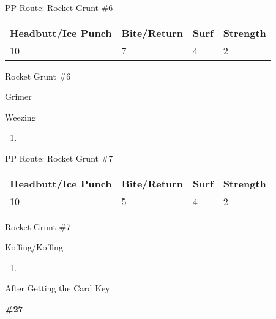 \begin{paracol}{2}
\switchcolumn*
\begin{misc}{PP Route: Rocket Grunt \#6}
	\varwb
	\begin{tabu} to \textwidth {X[6,c] X[5,c] X[4,c] X[4,c]}
		\textbf{Headbutt/Ice Punch} & \textbf{Bite/Return} & \textbf{Surf} & \textbf{Strength}\\ 
		10 & 7 & 4 & 2
	\end{tabu}
	\varwe
\end{misc}

\switchcolumn
\begin{trainer}{Rocket Grunt \#6}
	\varwb
	\begin{fightSection}{Grimer}
		\item {} \strength
	\end{fightSection}
	\begin{fightSection}{Weezing}
		\item {} \icePunch
	\end{fightSection}
	\varwe
\end{trainer}

\begin{enumerate}[resume]
	\item {}
\end{enumerate}

\switchcolumn*
\begin{misc}{PP Route: Rocket Grunt \#7}
	\varwb
	\begin{tabu} to \textwidth {X[6,c] X[5,c] X[4,c] X[4,c]}
		\textbf{Headbutt/Ice Punch} & \textbf{Bite/Return} & \textbf{Surf} & \textbf{Strength}\\ 
		10 & 5 & 4 & 2
	\end{tabu}
	\varwe
\end{misc}

\switchcolumn
\begin{trainer}{Rocket Grunt \#7}
	\varwb
	\begin{fightSection}{Koffing/Koffing}
		\item {} \bite{} 
	\end{fightSection}
	\varwe
\end{trainer}

\begin{enumerate}[resume]
	\item {}
\end{enumerate}

\begin{menu}{After Getting the Card Key}
	\varwb
	\begin{packMenu}
		\item \menuHlTwo{(\pointLeft{})} \textbf{\#27 \return{}} \switch{} \bite{} 
		\item \escapeRope
	\end{packMenu}
	\varwe
\end{menu}


\end{paracol}
